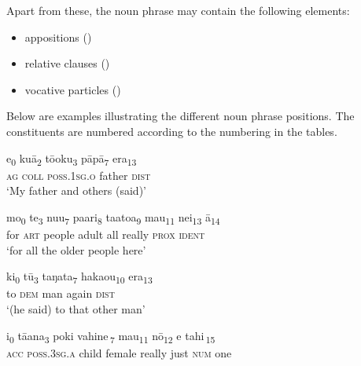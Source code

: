 Apart from these, the noun phrase may contain the following elements:

\begin{itemize}
\item 
appositions ()

\item 
relative clauses ()

\item 
vocative particles ()

\end{itemize}

Below are examples illustrating the different noun phrase positions. The constituents are numbered according to the numbering in the tables.

\ea\label{ex:5.1}
\gll e\textsubscript{0} kuā\textsubscript{2} tō{\ꞌ}oku\textsubscript{3} pāpā\textsubscript{7} era\textsubscript{13}\\
\textsc{ag} \textsc{coll} \textsc{poss.1sg.o} father \textsc{dist}\\

\glt 
‘My father and others (said)’ \textstyleExampleref{[R412.383]} 
\z

\ea\label{ex:5.2}
\gll mo\textsubscript{0} te\textsubscript{3} nu{\ꞌ}u\textsubscript{7} pa{\ꞌ}ari\textsubscript{8} ta{\ꞌ}ato{\ꞌ}a\textsubscript{9} mau\textsubscript{11} nei\textsubscript{13} {\ꞌ}ā\textsubscript{14}\\
for \textsc{art} people adult all really \textsc{prox} \textsc{ident}\\

\glt 
‘for all the older people here’ \textstyleExampleref{[R207.017]} 
\z

\ea\label{ex:5.3}
\gll ki\textsubscript{0} tū\textsubscript{3} taŋata\textsubscript{7} haka{\ꞌ}ou\textsubscript{10} era\textsubscript{13} \\
to \textsc{dem} man again \textsc{dist} \\

\glt 
‘(he said) to that other man’ \textstyleExampleref{[R102.020]} 
\z

\ea\label{ex:5.4}
\gll i\textsubscript{0} tā{\ꞌ}ana\textsubscript{3} {\ob}poki vahine\,{\cb}\textsubscript{7} mau\textsubscript{11} nō\textsubscript{12} {\ob}e tahi\,{\cb}\textsubscript{15}\\
\textsc{acc} \textsc{poss.3sg.a} {\db}child female really just {\db}\textsc{num} one\\

